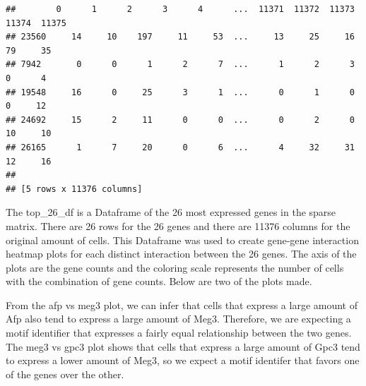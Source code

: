 \documentclass[
]{article}
\begin{document}
\begin{verbatim}
##        0      1      2      3      4      ...  11371  11372  11373  11374  11375
## 23560     14     10    197     11     53  ...     13     25     16     79     35
## 7942       0      0      1      2      7  ...      1      2      3      0      4
## 19548     16      0     25      3      1  ...      0      1      0      0     12
## 24692     15      2     11      0      0  ...      0      2      0     10     10
## 26165      1      7     20      0      6  ...      4     32     31     12     16
## 
## [5 rows x 11376 columns]
\end{verbatim}

The top\_26\_df is a Dataframe of the 26 most expressed genes in the
sparse matrix. There are 26 rows for the 26 genes and there are 11376
columns for the original amount of cells. This Dataframe was used to
create gene-gene interaction heatmap plots for each distinct interaction
between the 26 genes. The axis of the plots are the gene counts and the
coloring scale represents the number of cells with the combination of
gene counts. Below are two of the plots made.

From the afp vs meg3 plot, we can infer that cells that express a large
amount of Afp also tend to express a large amount of Meg3. Therefore, we
are expecting a motif identifier that expresses a fairly equal
relationship between the two genes. The meg3 vs gpc3 plot shows that
cells that express a large amount of Gpc3 tend to express a lower amount
of Meg3, so we expect a motif identifer that favors one of the genes
over the other.
\end{document}
